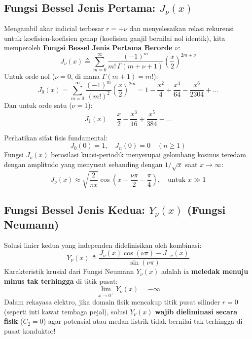 \documentclass[11pt,a4paper]{article}
\theoremstyle{definition}
\begin{document}
\subsection{Fungsi Bessel Jenis Pertama: \texorpdfstring{$J_\nu(x)$}{J\_nu(x)}}
Mengambil akar indicial terbesar $r = +\nu$ dan menyelesaikan relasi rekurensi untuk koefisien-koefisien genap (koefisien ganjil bernilai nol identik), kita memperoleh \textbf{Fungsi Bessel Jenis Pertama Berorde $\nu$}:
\begin{equation}
    J_\nu(x) \triangleq \sum_{m=0}^{\infty} \frac{(-1)^m}{m! \, \Gamma(m + \nu + 1)} \left(\frac{x}{2}\right)^{2m + \nu}
    \label{eq:bessel_j_series}
\end{equation}
Untuk orde nol ($\nu = 0$, di mana $\Gamma(m+1) = m!$):
\begin{equation}
    J_0(x) = \sum_{m=0}^{\infty} \frac{(-1)^m}{(m!)^2} \left(\frac{x}{2}\right)^{2m} = 1 - \frac{x^2}{4} + \frac{x^4}{64} - \frac{x^6}{2304} + \dots
    \label{eq:bessel_j0}
\end{equation}
Dan untuk orde satu ($\nu = 1$):
\begin{equation}
    J_1(x) = \frac{x}{2} - \frac{x^3}{16} + \frac{x^5}{384} - \dots
    \label{eq:bessel_j1}
\end{equation}

Perhatikan sifat fisis fundamental:
\begin{equation}
    J_0(0) = 1, \quad J_n(0) = 0 \quad (n \ge 1)
\end{equation}
Fungsi $J_\nu(x)$ berosilasi kuasi-periodik menyerupai gelombang kosinus teredam dengan amplitudo yang menyusut sebanding dengan $1/\sqrt{x}$ saat $x \to \infty$:
\begin{equation}
    J_\nu(x) \approx \sqrt{\frac{2}{\pi x}} \cos\left( x - \frac{\nu\pi}{2} - \frac{\pi}{4} \right), \quad \text{untuk } x \gg 1
\end{equation}

\subsection{Fungsi Bessel Jenis Kedua: \texorpdfstring{$Y_\nu(x)$}{Y\_nu(x)} (Fungsi Neumann)}
Solusi linier kedua yang independen didefinisikan oleh kombinasi:
\begin{equation}
    Y_\nu(x) \triangleq \frac{J_\nu(x) \cos(\nu\pi) - J_{-\nu}(x)}{\sin(\nu\pi)}
    \label{eq:bessel_y_neumann}
\end{equation}
Karakteristik krusial dari Fungsi Neumann $Y_\nu(x)$ adalah ia \textbf{meledak menuju minus tak terhingga} di titik pusat:
\begin{equation}
    \lim_{x \to 0^+} Y_\nu(x) = -\infty
    \label{eq:neumann_blowup}
\end{equation}
Dalam rekayasa elektro, jika domain fisik mencakup titik pusat silinder $r = 0$ (seperti inti kawat tembaga pejal), solusi $Y_\nu(x)$ \textbf{wajib dieliminasi secara fisik} ($C_2 = 0$) agar potensial atau medan listrik tidak bernilai tak terhingga di pusat konduktor!
\end{document}
